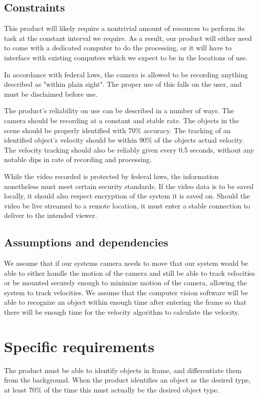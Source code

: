 \documentclass[letterpaper,10pt,onecolumn,draftclsnofoot]{IEEEtran}
\begin{document}
\subsection{Constraints}
This product will likely require a nontrivial amount of resources to perform its task at the constant interval we require.
As a result, our product will either need to come with a dedicated computer to do the processing, or it will have to interface with existing computers which we expect to be in the locations of use.

In accordance with federal laws, the camera is allowed to be recording anything described as "within plain sight".
The proper use of this falls on the user, and must be disclaimed before use.

The product's reliability on use can be described in a number of ways.
The camera should be recording at a constant and stable rate.
The objects in the scene should be properly identified with 70\% accuracy.
The tracking of an identified object's velocity should be within 90\% of the objects actual velocity.
The velocity tracking should also be reliably given every 0.5 seconds, without any notable dips in rate of recording and processing.

While the video recorded is protected by federal laws, the information nonetheless must meet certain security standards.
If the video data is to be saved locally, it should also respect encryption of the system it is saved on.
Should the video be live streamed to a remote location, it must enter a stable connection to deliver to the intended viewer.

\subsection{Assumptions and dependencies}
We assume that if our systems camera needs to move that our system would be able to either handle the motion of the camera and still be able to track velocities or be mounted securely enough to minimize motion of the camera, allowing the system to track velocities.
We assume that the computer vision software will be able to recognize an object within enough time after entering the frame so that there will be enough time for the velocity algorithm to calculate the velocity.

\section{Specific requirements}
The product must be able to identify objects in frame, and differentiate them from the background.
When the product identifies an object as the desired type, at least 70\% of the time this must actually be the desired object type.
\end{document}
